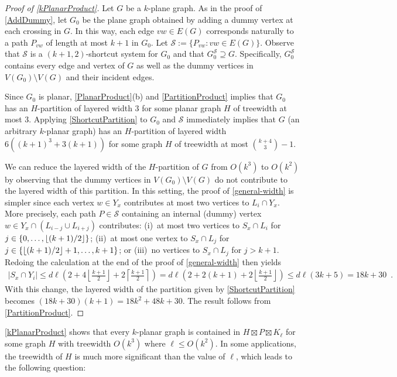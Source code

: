 \documentclass{patmorin}
\theoremstyle{plain}
\theoremstyle{definition}
\DeclarePairedDelimiter{\floor}{\lfloor}{\rfloor}
\renewcommand{\SS}{\mathcal{S}}
\renewcommand{\le}{\leqslant}
\renewcommand{\leq}{\leqslant}
\begin{document}
\begin{proof}[Proof of \cref{kPlanarProduct}]
  Let $G$ be a $k$-plane graph.  As in the proof of \cref{AddDummy}, let $G_0$ be the plane graph obtained by adding a dummy vertex at each crossing in $G$. In this way, each edge $vw\in E(G)$ corresponds naturally to a path $P_{vw}$ of length at most $k+1$ in $G_0$.  Let $\SS := \{P_{vw}: vw\in E(G)\}$. Observe that $\SS$ is a $(k+1,2)$-shortcut system for $G_0$ and that $G_0^{\SS}\supseteq G$.  Specifically, $G_0^{\SS}$ contains every edge and vertex of $G$ as well as the dummy vertices in $V(G_0)\setminus V(G)$ and their incident edges.

  Since $G_0$ is planar,  \cref{PlanarProduct}(b) and \cref{PartitionProduct} implies that $G_0$ has an $H$-partition of layered width 3 for some planar graph $H$ of treewidth at most 3.  Applying \cref{ShortcutPartition} to $G_0$ and $\SS$ immediately implies that $G$ (an arbitrary $k$-planar graph) has an $H$-partition of layered width $6((k+1)^3+3(k+1))$ for some graph $H$ of treewidth at most $\binom{k+4}{3}-1$.

  We can reduce the layered width of the $H$-partition of $G$ from $O(k^3)$ to $O(k^2)$ by observing that the dummy vertices in $V(G_0)\setminus V(G)$ do not contribute to the layered width of this partition.  In this setting, the proof of \cref{general-width} is simpler since each vertex $w\in Y_x$ contributes at most two vertices to $L_i\cap Y_x$.  More precisely, each path $P\in\SS$ containing an internal (dummy) vertex $w\in Y_x\cap (L_{i-j}\cup L_{i+j})$ contributes: (i)~at most two vertices to $S_x\cap L_i$ for $j\in\{0,\ldots,\floor{(k+1)/2}\}$; (ii)~at most one vertex to $S_x\cap L_j$ for $j\in\{\floor{(k+1)/2}+1,\ldots,k+1\}$; or (iii)~no vertices to $S_x\cap L_j$ for $j > k+1$.
  Redoing the calculation at the end of the proof of \cref{general-width} then yields
  \begin{align*}
  |S_x\cap Y_i| \le d\ell\left(
  2
  + 4\left\lfloor\tfrac{k+1}{2}\right\rfloor
  + 2\left\lceil\tfrac{k+1}{2}\right\rceil
  \right)
   =
  d\ell\left(
  2 + 2(k+1) + 2\left\lfloor\tfrac{k+1}{2}\right\rfloor
  \right)
   \le
  d\ell(3k+5)
  = 18k+30 \enspace .
  \end{align*}
  With this change, the layered width of the partition given by \cref{ShortcutPartition} becomes $(18k+30)(k+1)=18k^2+48k+30$.
  The result follows from \cref{PartitionProduct}.
\end{proof}


\cref{kPlanarProduct} shows that every $k$-planar graph is contained in $H\boxtimes P \boxtimes K_\ell$ for some graph $H$ with treewidth $O(k^3)$ where $\ell\leq O(k^2)$.  In some applications, the treewidth of $H$ is much more significant than the value of $\ell$, which leads to the following question:
\end{document}
